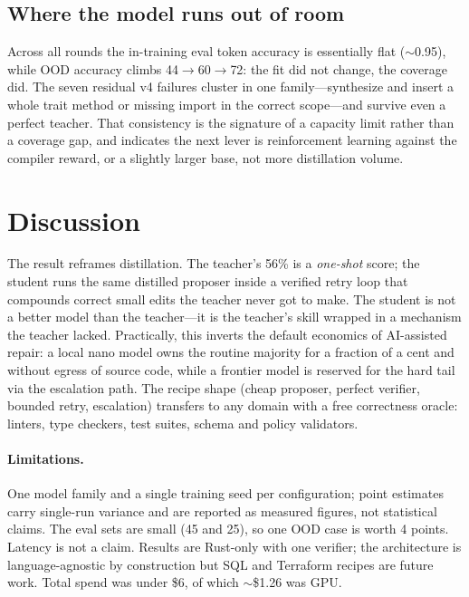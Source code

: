 \documentclass[10pt,twocolumn]{article}
\begin{document}
\subsection{Where the model runs out of room}

Across all rounds the in-training eval token accuracy is essentially flat
($\sim$0.95), while OOD accuracy climbs 44$\rightarrow$60$\rightarrow$72: the fit
did not change, the coverage did. The seven residual v4 failures cluster in one
family---synthesize and insert a whole trait method or missing import in the
correct scope---and survive even a perfect teacher. That consistency is the
signature of a capacity limit rather than a coverage gap, and indicates the next
lever is reinforcement learning against the compiler reward, or a slightly larger
base, not more distillation volume.

\section{Discussion}

The result reframes distillation. The teacher's 56\% is a \emph{one-shot} score;
the student runs the same distilled proposer inside a verified retry loop that
compounds correct small edits the teacher never got to make. The student is not a
better model than the teacher---it is the teacher's skill wrapped in a mechanism
the teacher lacked. Practically, this inverts the default economics of AI-assisted
repair: a local nano model owns the routine majority for a fraction of a cent and
without egress of source code, while a frontier model is reserved for the hard
tail via the escalation path. The recipe shape (cheap proposer, perfect verifier,
bounded retry, escalation) transfers to any domain with a free correctness oracle:
linters, type checkers, test suites, schema and policy validators.

\paragraph{Limitations.} One model family and a single training seed per
configuration; point estimates carry single-run variance and are reported as
measured figures, not statistical claims. The eval sets are small (45 and 25),
so one OOD case is worth 4 points. Latency is not a claim. Results are Rust-only
with one verifier; the architecture is language-agnostic by construction but SQL
and Terraform recipes are future work. Total spend was under \$6, of which
$\sim$\$1.26 was GPU.
\end{document}
